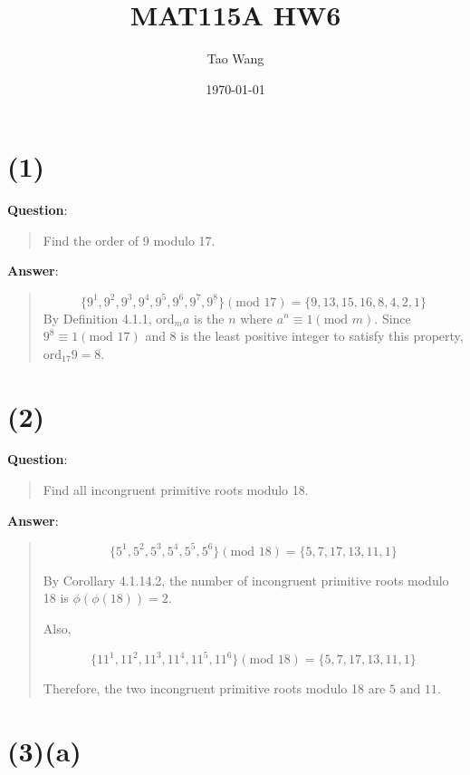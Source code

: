 \documentclass{article} %
\begin{document}
\title{MAT115A HW6}
\author{Tao Wang}
\date{\today}

\maketitle

\section*{(1)}

\bigskip
\noindent
\textbf{Question}:
\begin{quote}
    Find the order of 9 modulo 17.
\end{quote}

\bigskip
\noindent
\textbf{Answer}:
\begin{quote}
    \[\{9^1, 9^2, 9^3, 9^4, 9^5, 9^6, 9^7, 9^8\} (\text{mod }17) = \{9, 13, 15, 16, 8, 4, 2, 1\}\]
    By Definition 4.1.1, $\text{ord}_m a$ is the $n$ where $a^n \equiv 1 (\text{mod }m)$.
    Since $9^8 \equiv 1 (\text{mod } 17)$ and 8 is the least positive integer to satisfy this property, $\boxed{\text{ord}_{17} 9 = 8}$.
\end{quote}

\bigskip

\section*{(2)}

\bigskip
\noindent
\textbf{Question}:
\begin{quote}
    Find all incongruent primitive roots modulo 18.
\end{quote}

\bigskip
\noindent
\textbf{Answer}:
\begin{quote}
    \[\{5^1, 5^2, 5^3, 5^4, 5^5, 5^6\} (\text{mod } 18) = \{5, 7, 17, 13, 11, 1\}\]

    By Corollary 4.1.14.2, the number of incongruent primitive roots modulo 18 is $\phi(\phi(18)) = 2$.

    Also,

    \[\{11^1, 11^2, 11^3, 11^4, 11^5, 11^6\} (\text{mod } 18) = \{5, 7, 17, 13, 11, 1\}\]

    Therefore, the two incongruent primitive roots modulo 18 are $\boxed{\text{5 and 11}}$.

\end{quote}

\section*{(3)(a)}
\end{document}
